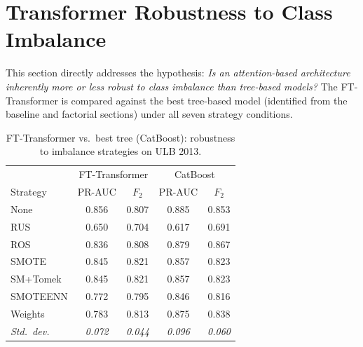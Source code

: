 \section{Transformer Robustness to Class Imbalance}
\label{sec:transformer_imbalance}

This section directly addresses the hypothesis:
\emph{Is an attention-based architecture inherently more or less robust to
class imbalance than tree-based models?}
The FT-Transformer is compared against the best tree-based model
(identified from the baseline and factorial sections) under all seven
strategy conditions.

\begin{table}[ht!]
\centering
\caption{FT-Transformer vs.\ best tree (CatBoost): robustness to imbalance strategies on ULB 2013.}
\label{tab:transformer_robustness_ulb}
\begin{tabular}{l cc cc}
\toprule
& \multicolumn{2}{c}{FT-Transformer} & \multicolumn{2}{c}{CatBoost} \\
Strategy & PR-AUC & $F_2$ & PR-AUC & $F_2$ \\
\midrule
None      & 0.856 & 0.807 & 0.885 & 0.853 \\
RUS       & 0.650 & 0.704 & 0.617 & 0.691 \\
ROS       & 0.836 & 0.808 & 0.879 & 0.867 \\
SMOTE     & 0.845 & 0.821 & 0.857 & 0.823 \\
SM+Tomek  & 0.845 & 0.821 & 0.857 & 0.823 \\
SMOTEENN  & 0.772 & 0.795 & 0.846 & 0.816 \\
Weights   & 0.783 & 0.813 & 0.875 & 0.838 \\
\midrule
\textit{Std.\ dev.} & \textit{0.072} & \textit{0.044} & \textit{0.096} & \textit{0.060} \\
\bottomrule
\end{tabular}
\end{table}


